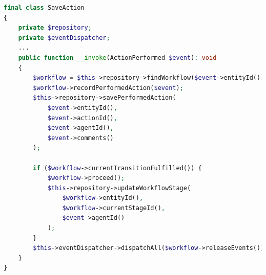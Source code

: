 \begin{lstlisting}[language=php, caption={Workflow registration for a Figure document to be approved by the EB.}, basicstyle=\tiny, label=lst:saveAction]
final class SaveAction
{
    private $repository;
    private $eventDispatcher;
    ...
    public function __invoke(ActionPerformed $event): void
    {
        $workflow = $this->repository->findWorkflow($event->entityId());
        $workflow->recordPerformedAction($event);
        $this->repository->savePerformedAction(
            $event->entityId(),
            $event->actionId(),
            $event->agentId(),
            $event->comments()
        );

        if ($workflow->currentTransitionFulfilled()) {
            $workflow->proceed();
            $this->repository->updateWorkflowStage(
                $workflow->entityId(),
                $workflow->currentStageId(),
                $event->agentId()
            );
        }
        $this->eventDispatcher->dispatchAll($workflow->releaseEvents());
    }
}
\end{lstlisting}

